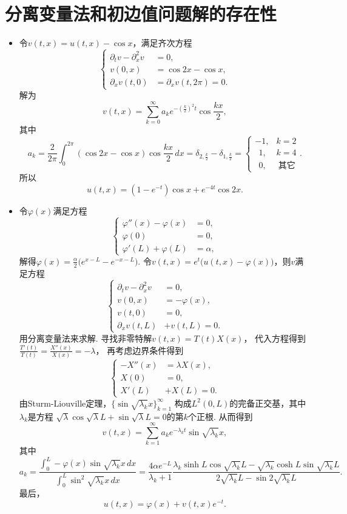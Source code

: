 \section{分离变量法和初边值问题解的存在性}
\begin{itemize}
\item[5.]
令$v(t,x)=u(t,x)-\cos x$，满足齐次方程
\[
    \left\{\begin{aligned}
        \partial_tv-\partial_x^2v&=0,\\
        v(0,x)&=\cos2x-\cos x,\\
        \partial_xv(t,0)&=\partial_xv(t,2\pi)=0.
    \end{aligned}\right.
\]
解为\[
    v(t,x)=\sum_{k=0}^\infty a_k e^{-\left(\frac{k}{2}\right)^2t}\cos\frac{kx}{2},
\]
其中
\[
    a_k=\frac{2}{2\pi}\int_0^{2\pi} (\cos2x-\cos x)\cos\frac{kx}{2} \,dx
    =\delta_{2,\frac{k}{2}}-\delta_{1,\frac{k}{2}}
    =\begin{cases}-1,&k=2\\\ \ 1,&k=4\\\ \ 0,&\ \text{其它}\end{cases}.
\]
所以
$$u(t,x)=(1-e^{-t})\cos x+e^{-4t}\cos2x.$$

\item[6.]
令$\varphi(x)$满足方程
\[
    \left\{\begin{aligned}
        \varphi''(x)-\varphi(x)&=0,\\
        \varphi(0)&=0,\\
        \varphi'(L)+\varphi(L)&=\alpha,
    \end{aligned}\right.
\]
解得$\varphi(x)=\frac{\alpha}{2}\big(e^{x-L}-e^{-x-L}\big)$. 
令$v(t,x)=e^t\big(u(t,x)-\varphi(x)\big)$，则$v$满足方程
\[
    \left\{\begin{aligned}
        \partial_t v -\partial_x^2 v&=0,\\
        v(0,x)&=-\varphi(x),\\
        v(t,0)&=0,\\
        \partial_x v(t,L)&+v(t,L)=0.
    \end{aligned}\right.
\]
用分离变量法来求解. 寻找非零特解$v(t,x)=T(t)X(x)$，
代入方程得到$\frac{T'(t)}{T(t)}=\frac{X''(x)}{X(x)}=-\lambda$，
再考虑边界条件得到
\[
    \left\{\begin{aligned}
        -X''(x)&= \lambda X(x),\\
        X(0)&=0,\\
        X'(L)&+X(L)=0.
    \end{aligned}\right.
\]
由Sturm-Liouville定理，$\big\{\!\sin \sqrt{\lambda_k} x\big\}_{k=1}^\infty$
构成$L^2(0,L)$的完备正交基，其中$\lambda_k$是方程
$\sqrt{\lambda}\cos \sqrt{\lambda}L +\sin \sqrt{\lambda}L=0$的第$k$个正根. 从而得到
\[
    v(t,x)=\sum_{k=1}^\infty a_k e^{-\lambda_k t}\sin\sqrt{\lambda_k}x,
\]
其中
\[
    a_k=\frac{\int_0^L -\varphi(x) \sin\sqrt{\lambda_k}x \,dx}{\int_0^L \sin^2\!\sqrt{\lambda_k}x \, dx}
    =\frac{4\alpha e^{-L}}{\lambda_k+1} \frac{\lambda_k\sinh L \cos\sqrt{\lambda_k}L-\sqrt{\lambda_k}\cosh L \sin \sqrt{\lambda_k }L}{2\sqrt{\lambda_k}L -\sin 2\sqrt{\lambda_k}L}.
\]
最后，$$u(t,x)=\varphi(x)+v(t,x)e^{-t}.$$
\end{itemize}

